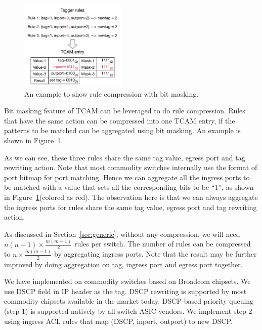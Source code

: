 \begin{figure}
	\centering
	\includegraphics[width=0.45\textwidth] {figs/compression_with_bitmasking}
	\caption{An example to show rule compression with bit masking.}\label{fig:compression}
	
\end{figure}


Bit masking feature of TCAM can be leveraged to do rule compression. Rules that have the same action can be compressed into one TCAM entry, if the patterns to be matched can be aggregated using bit masking. An example is shown in Figure~\ref{fig:compression}. 

As we can see, these three rules share the same tag value, egress port and tag rewriting action. Note that most commodity switches internally use the format of port bitmap for port matching. Hence we can aggregate all the ingress ports to be matched with a value that sets all the corresponding bits to be ``1'', as shown in Figure~\ref{fig:compression}(colored as red). The observation here is that we can always aggregate the ingress ports for rules share the same tag value, egress port and tag rewriting action.

As discussed in Section~\ref{sec:generic}, without any compression, we will need $n(n-1)\times \frac{m(m-1)}{2}$ rules per switch. The number of rules can be compressed to $n\times \frac{m(m-1)}{2}$ by aggregating ingress ports. Note that the result may be further improved by doing aggregation on tag, ingress port and egress port together. 


We have implemented \sysname{} on commodity switches based on Broadcom chipsets.
We use DSCP field in IP header as the tag. DSCP rewriting is supported by most
commodity chipsets available in the market today. DSCP-based priority queuing
(step 1) is supported natively by all switch ASIC vendors. We implement step 2
using ingress ACL rules that map (DSCP, inport, outport) to new DSCP. 

